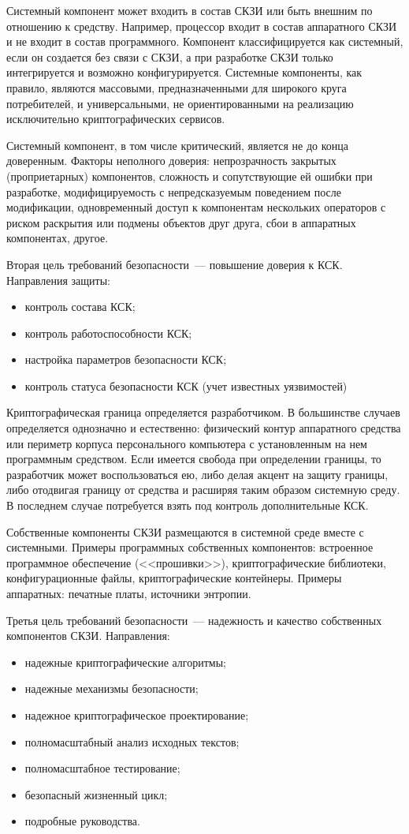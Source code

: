 Системный компонент может входить в состав СКЗИ или быть внешним по отношению
к средству. Например, процессор входит в состав аппаратного СКЗИ и не входит в 
состав программного. 
%
Компонент классифицируется как системный, если он создается без связи с 
СКЗИ, а при разработке СКЗИ только интегрируется и возможно конфигурируется.
%
Системные компоненты, как правило, являются массовыми, предназначенными для 
широкого круга потребителей, и универсальными, не ориентированными на 
реализацию исключительно криптографических сервисов.

Системный компонент, в том числе критический, является не до конца доверенным. 
% 
Факторы неполного доверия:
%
непрозрачность закрытых (проприетарных) компонентов,
%
сложность и сопутствующие ей ошибки при разработке,
%
модифицируемость с непредсказуемым поведением после модификации,
%
одновременный доступ к компонентам нескольких операторов с риском раскрытия или 
подмены объектов друг друга,
%
сбои в аппаратных компонентах,
%
другое.

Вторая цель требований безопасности~--- повышение доверия к КСК. 
Направления защиты:
\begin{itemize}
\item
контроль состава КСК;
\item
контроль работоспособности КСК;
\item
настройка параметров безопасности КСК;
\item
контроль статуса безопасности КСК (учет известных уязвимостей)
\end{itemize}

Криптографическая граница определяется разработчиком.
В большинстве случаев определяется однозначно и естественно:  
физический контур аппаратного средства или периметр корпуса персонального 
компьютера с установленным на нем программным средством.
%
Если имеется свобода при определении границы, то разработчик может
воспользоваться ею, либо делая акцент на защиту границы, либо отодвигая границу
от средства и расширяя таким образом системную среду. В последнем случае
потребуется взять под контроль дополнительные КСК.

Собственные компоненты СКЗИ размещаются в системной среде вместе с системными.
Примеры программных собственных компонентов: 
встроенное программное обеспечение (<<прошивки>>),
криптографические библиотеки, конфигурационные файлы, криптографические 
контейнеры.
%
Примеры аппаратных: печатные платы, источники энтропии.

Третья цель требований безопасности~--- надежность и качество собственных 
компонентов СКЗИ.
%
Направления:
\begin{itemize}
\item 
надежные криптографические алгоритмы;
\item 
надежные механизмы безопасности;
\item 
надежное криптографическое проектирование;
\item 
полномасштабный анализ исходных текстов;
\item 
полномасштабное тестирование;
\item 
безопасный жизненный цикл;
\item 
подробные руководства.
\end{itemize}
